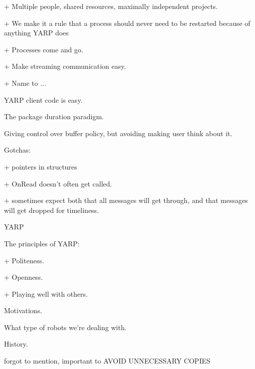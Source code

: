 

+ Multiple people, shared resources, maximally independent projects.

+ We make it a rule that a process should never need to be restarted
  because of anything YARP does

+ Processes come and go.

+ Make streaming communication easy.

+ Name to ...




YARP client code is easy.

The package duration paradigm.

Giving control over buffer policy, but avoiding making user
think about it.

Gotchas:

+ pointers in structures

+ OnRead doesn't often get called.

+ sometimes expect both that all messages will get through, and
  that messages will get dropped for timeliness.

YARP

The principles of YARP:

+ Politeness.

+ Openness.

+ Playing well with others.

Motivations.

What type of robots we're dealing with.

History.

forgot to mention, important to AVOID UNNECESSARY COPIES

